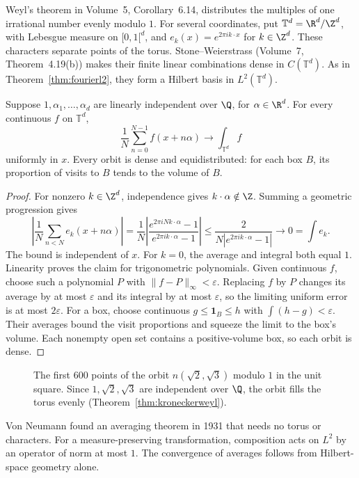 Weyl's theorem in Volume~5, Corollary~6.14, distributes the multiples of one irrational number evenly modulo $1$. For several coordinates, put $\mathbb T^d=\R^d/\Z^d$, with Lebesgue measure on $[0,1[^d$, and $e_k(x)=e^{2\pi ik\cdot x}$ for $k\in\Z^d$. These characters separate points of the torus. Stone--Weierstrass (Volume~7, Theorem~4.19(b)) makes their finite linear combinations dense in $C(\mathbb T^d)$. As in Theorem~\ref{thm:fourierl2}, they form a Hilbert basis in $L^2(\mathbb T^d)$.

\begin{theorem}\label{thm:kroneckerweyl}
Suppose $1,\alpha_1,\dots,\alpha_d$ are linearly independent over $\Q$, for $\alpha\in\R^d$. For every continuous $f$ on $\mathbb T^d$,
\[\frac1N\sum_{n=0}^{N-1}f(x+n\alpha)\longrightarrow\int_{\mathbb T^d}f\]
uniformly in $x$. Every orbit is dense and equidistributed: for each box $B$, its proportion of visits to $B$ tends to the volume of $B$.
\end{theorem}
\begin{proof}
For nonzero $k\in\Z^d$, independence gives $k\cdot\alpha\notin\Z$. Summing a geometric progression gives
\[\left|\frac1N\sum_{n<N}e_k(x+n\alpha)\right|=\frac1N\left|\frac{e^{2\pi iNk\cdot\alpha}-1}{e^{2\pi ik\cdot\alpha}-1}\right|\le\frac2{N|e^{2\pi ik\cdot\alpha}-1|}\longrightarrow0=\int e_k.\]
The bound is independent of $x$. For $k=0$, the average and integral both equal $1$. Linearity proves the claim for trigonometric polynomials. Given continuous $f$, choose such a polynomial $P$ with $\|f-P\|_\infty<\varepsilon$. Replacing $f$ by $P$ changes its average by at most $\varepsilon$ and its integral by at most $\varepsilon$, so the limiting uniform error is at most $2\varepsilon$. For a box, choose continuous $g\le\mathbf 1_B\le h$ with $\int(h-g)<\varepsilon$. Their averages bound the visit proportions and squeeze the limit to the box's volume. Each nonempty open set contains a positive-volume box, so each orbit is dense.
\end{proof}

\begin{figure}[ht]
\centering
{}
\caption{The first $600$ points of the orbit $n(\sqrt2,\sqrt3)$ modulo $1$ in the unit square. Since $1,\sqrt2,\sqrt3$ are independent over $\Q$, the orbit fills the torus evenly (Theorem~\ref{thm:kroneckerweyl}).}
\label{fig:kronecker}
\end{figure}

Von Neumann found an averaging theorem in 1931 that needs no torus or characters. For a measure-preserving transformation, composition acts on $L^2$ by an operator of norm at most $1$. The convergence of averages follows from Hilbert-space geometry alone.

